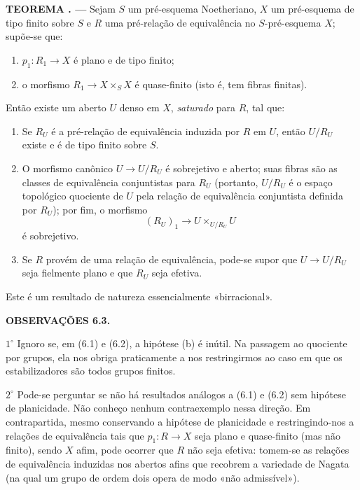 \documentclass[11pt,twoside,openany]{book}
\numberwithin{equation}{section}
\newcommand{\src}[1]{%
  \phantomsection\hypertarget{src:#1}{}%
  \marginpar{\raggedleft\footnotesize\sffamily #1}%
}
\theoremstyle{plain}
\theoremstyle{definition}
\theoremstyle{remark}
\newcommand{\result}[2]{%
  \par\medskip\noindent\textbf{#1%
  \if\relax\detokenize{#2}\relax\else\space#2\fi. ---}\enspace
}
\newcommand{\FgaUnitKey}{frontmatter}
\renewcommand{\src}[1]{%
  \phantomsection\hypertarget{src:\FgaUnitKey:#1}{}%
  \marginpar{\raggedleft\footnotesize\sffamily #1}%
}
\begin{document}
\result{TEOREMA}{6.2} Sejam $S$ um pré-esquema Noetheriano, $X$ um
pré-esquema de tipo finito sobre $S$ e $R$ uma pré-relação de equivalência no
$S$-pré-esquema $X$; supõe-se que:
\begin{enumerate}
\item[(a)] $p_1:R_1\to X$ é plano e de tipo finito;
\item[(b)] o morfismo $R_1\to X\times_S X$ é quase-finito (isto é, tem fibras
finitas).
\end{enumerate}
Então existe um aberto $U$ denso em $X$, \emph{saturado} para $R$, tal que:
\begin{enumerate}
\item[(i)] Se $R_U$ é a pré-relação de equivalência induzida por $R$ em $U$,
então $U/R_U$ existe e é de tipo finito sobre $S$.

\item[(ii)] O morfismo canônico $U\to U/R_U$ é sobrejetivo e aberto; suas
fibras são as classes de equivalência conjuntistas para $R_U$ (portanto,
$U/R_U$ é o espaço topológico quociente de $U$ pela relação de equivalência
conjuntista definida por $R_U$); por fim, o morfismo
\[
  (R_U)_1\longrightarrow U\times_{U/R_U}U
\]
é sobrejetivo.
\src{114}

\item[(iii)] Se $R$ provém de uma relação de equivalência, pode-se supor que
$U\to U/R_U$ seja fielmente plano e que $R_U$ seja efetiva.
\end{enumerate}

Este é um resultado de natureza essencialmente «birracional».

\medskip
\noindent\textbf{OBSERVAÇÕES 6.3.}

\smallskip
\noindent $1^\circ$ Ignoro se, em (6.1) e (6.2), a hipótese (b) é inútil. Na
passagem ao quociente por grupos, ela nos obriga praticamente a nos
restringirmos ao caso em que os estabilizadores são todos grupos finitos.

\smallskip
\noindent $2^\circ$ Pode-se perguntar se não há resultados análogos a (6.1) e
(6.2) sem hipótese de planicidade. Não conheço nenhum contraexemplo nessa
direção. Em contrapartida, mesmo conservando a hipótese de planicidade e
restringindo-nos a relações de equivalência tais que $p_1:R\to X$ seja plano e
quase-finito (mas não finito), sendo $X$ afim, pode ocorrer que $R$ não seja
efetiva: tomem-se as relações de equivalência induzidas nos abertos afins que
recobrem a variedade de Nagata (na qual um grupo de ordem dois opera de modo
«não admissível»).
\end{document}
